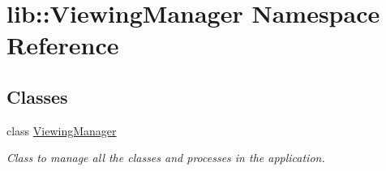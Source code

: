 \hypertarget{namespacelib_1_1ViewingManager}{\section{lib\-:\-:\-Viewing\-Manager \-Namespace \-Reference}
\label{namespacelib_1_1ViewingManager}
}
\subsection*{\-Classes}
\begin{DoxyCompactItemize}
\item 
class \hyperlink{classlib_1_1ViewingManager_1_1ViewingManager}{\-Viewing\-Manager}
\begin{DoxyCompactList}\small\item\em \-Class to manage all the classes and processes in the application. \end{DoxyCompactList}\end{DoxyCompactItemize}
